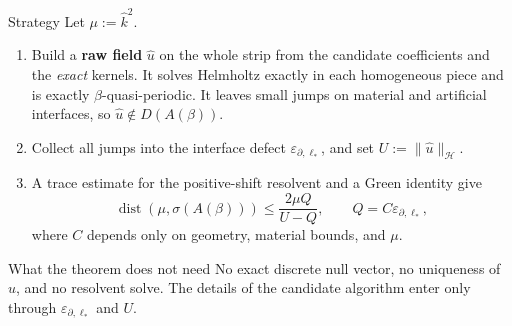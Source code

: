 \documentclass[aspectratio=169]{beamer}
\newcommand{\eps}{\varepsilon_{\partial,\ell_*}}
\newcommand{\dist}{\operatorname{dist}}
\begin{document}
\begin{frame}{Strategy}
  \small
  Let $\mu:=\widehat k^2$.
  \begin{enumerate}
    \item Build a \textbf{raw field} $\widehat u$ on the whole strip from the candidate
      coefficients and the \emph{exact} kernels. It solves Helmholtz exactly in each
      homogeneous piece and is exactly $\beta$-quasi-periodic. It leaves small jumps on
      material and artificial interfaces, so $\widehat u\notin D(A(\beta))$.
    \item Collect all jumps into the interface defect $\eps$, and set
      $U:=\lVert\widehat u\rVert_{\mathcal H}$.
    \item A trace estimate for the positive-shift resolvent and a Green identity give
      \[
        \dist(\mu,\sigma(A(\beta)))\le\frac{2\mu Q}{U-Q},\qquad Q=C\eps,
      \]
      where $C$ depends only on geometry, material bounds, and $\mu$.
  \end{enumerate}

  \begin{block}{What the theorem does not need}
    No exact discrete null vector, no uniqueness of $\widehat u$, and no resolvent
    solve. The details of the candidate algorithm enter only through $\eps$ and $U$.
  \end{block}
\end{frame}
\end{document}
